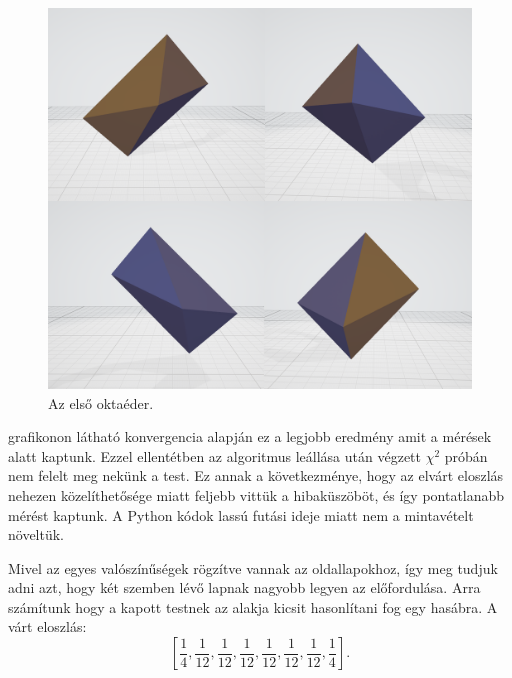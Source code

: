 \begin{figure}[h!]
	\centering
	\includegraphics[width=\textwidth]{images/octa01obj.png}
	\caption{Az első oktaéder.}
	\label{fig:octa01obj}
\end{figure}

 grafikonon látható konvergencia alapján ez a legjobb eredmény amit a mérések alatt kaptunk.
Ezzel ellentétben az algoritmus leállása után végzett $\chi^2$ próbán nem felelt meg nekünk a test.
Ez annak a következménye, hogy az elvárt eloszlás nehezen közelíthetősége miatt feljebb vittük a hibaküszöböt, és így pontatlanabb mérést kaptunk.
A Python kódok lassú futási ideje miatt nem a mintavételt növeltük.

Mivel az egyes valószínűségek rögzítve vannak az oldallapokhoz, így meg tudjuk adni azt, hogy két szemben lévő lapnak nagyobb legyen az előfordulása.
Arra számítunk hogy a kapott testnek az alakja kicsit hasonlítani fog egy hasábra.
A várt eloszlás:
\[
[\frac{1}{4}, \frac{1}{12}, \frac{1}{12}, \frac{1}{12}, \frac{1}{12}, \frac{1}{12}, \frac{1}{12}, \frac{1}{4}].
\]

